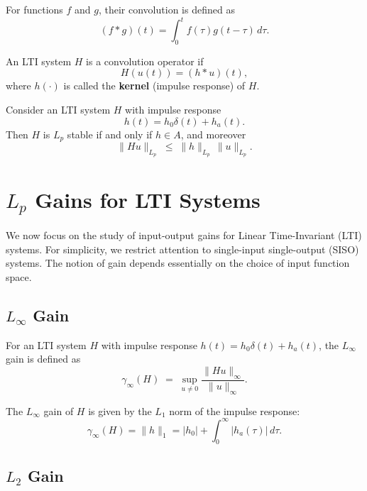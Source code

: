 \begin{definition}[Convolution]  
For functions $f$ and $g$, their convolution is defined as
\[
(f * g)(t) = \int_0^t f(\tau) g(t-\tau)\, d\tau.
\]
\end{definition}

\begin{definition}  
An LTI system $H$ is a convolution operator if
\[
H(u(t)) = (h * u)(t),
\]
where $h(\cdot)$ is called the \textbf{kernel} (impulse response) of $H$.  
\end{definition}

\begin{theorem}[Lp Stability]  
Consider an LTI system $H$ with impulse response
\[
h(t) = h_0 \delta(t) + h_a(t).
\]  
Then $H$ is $L_p$ stable if and only if $h \in A$, and moreover
\[
\|Hu\|_{L_p} \;\leq\; \|h\|_{L_p}\, \|u\|_{L_p}.
\]
\end{theorem}

\section{$L_p$ Gains for LTI Systems}

We now focus on the study of input-output gains for Linear Time-Invariant (LTI) systems.  
For simplicity, we restrict attention to single-input single-output (SISO) systems.  
The notion of gain depends essentially on the choice of input function space.

\subsection{$L_\infty$ Gain}

\begin{definition}
For an LTI system $H$ with impulse response $h(t) = h_0 \delta(t) + h_a(t)$, the $L_\infty$ gain is defined as
\[
\gamma_\infty(H) \;=\; \sup_{u \neq 0} \frac{\|Hu\|_\infty}{\|u\|_\infty}.
\]
\end{definition}

\begin{theorem}
The $L_\infty$ gain of $H$ is given by the $L_1$ norm of the impulse response:
\[
\gamma_\infty(H) = \|h\|_1 = |h_0| + \int_0^\infty |h_a(\tau)| \, d\tau.
\]
\end{theorem}

\subsection{$L_2$ Gain}

